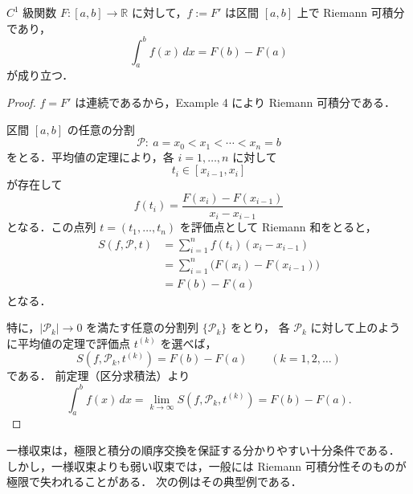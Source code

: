 
\begin{theorem}[微分積分学の第二基本定理]
$C^1$ 級関数 $F:[a,b]\to\mathbb R$ に対して，$f:=F'$ は区間 $[a,b]$ 上で Riemann 可積分であり，
\[
\int_a^b f(x)\,dx = F(b)-F(a)
\]
が成り立つ．
\end{theorem}

\begin{proof}
$f=F'$ は連続であるから，Example 4 により Riemann 可積分である．

区間 $[a,b]$ の任意の分割
\[
\mathcal P:\ a=x_0<x_1<\cdots<x_n=b
\]
をとる．平均値の定理により，各 $i=1,\dots,n$ に対して
\[
t_i\in[x_{i-1},x_i]
\]
が存在して
\[
f(t_i)=\frac{F(x_i)-F(x_{i-1})}{x_i-x_{i-1}}
\]
となる．この点列 $t=(t_1,\dots,t_n)$ を評価点として Riemann 和をとると，
\[
\begin{aligned}
S(f,\mathcal P,t)
&=
\sum_{i=1}^n f(t_i)(x_i-x_{i-1})\\
&=
\sum_{i=1}^n \bigl(F(x_i)-F(x_{i-1})\bigr)\\
&=
F(b)-F(a)
\end{aligned}
\]
となる．

特に，$|\mathcal P_k|\to 0$ を満たす任意の分割列 $\{\mathcal P_k\}$ をとり，
各 $\mathcal P_k$ に対して上のように平均値の定理で評価点 $t^{(k)}$ を選べば，
\[
S(f,\mathcal P_k,t^{(k)})=F(b)-F(a)
\qquad (k=1,2,\dots)
\]
である．
前定理（区分求積法）より
\[
\int_a^b f(x)\,dx
=
\lim_{k\to\infty} S(f,\mathcal P_k,t^{(k)})
=
F(b)-F(a).
\]
\end{proof}



\begin{remark}
一様収束は，極限と積分の順序交換を保証する分かりやすい十分条件である．
しかし，一様収束よりも弱い収束では，一般には Riemann 可積分性そのものが極限で失われることがある．
次の例はその典型例である．
\end{remark}

